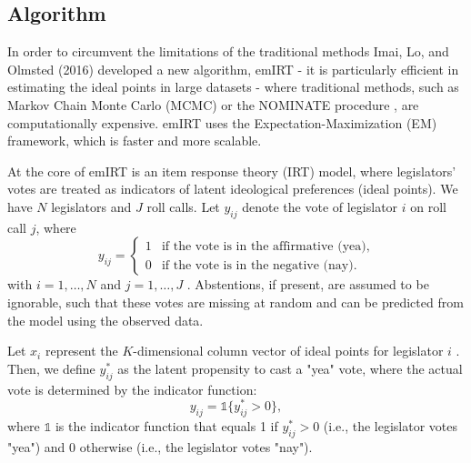 \documentclass[a4paper,12pt]{report}
\begin{document}
            \subsection{Algorithm}
                In order to circumvent the limitations of the traditional methods Imai, Lo, and Olmsted (2016) developed
                a
                new algorithm, emIRT - it is particularly efficient in estimating the ideal points in large datasets -
                where
                traditional methods, such as Markov Chain Monte Carlo
                (MCMC) or the NOMINATE procedure , are computationally expensive. emIRT uses the
                Expectation-Maximization (EM) framework, which is faster and more scalable.

                At the core of emIRT is an item response theory (IRT) model, where legislators' votes are treated as
                indicators of latent ideological preferences (ideal points).
                We have \( N \) legislators and \( J \) roll calls. Let \( y_{ij} \) denote the vote of legislator
                \( i \)
                on roll call \( j \), where
                \[
                    y_{ij} =
                    \begin{cases}
                        1 & \text{if the vote is in the affirmative (yea)}, \\
                        0 & \text{if the vote is in the negative (nay)}.
                    \end{cases}
                \]
                with \( i = 1, \dots, N \) and \( j = 1, \dots, J \)
                . Abstentions, if present, are assumed to be ignorable, such that these votes are missing at random and
                can be
                predicted from the model using the observed data.

                Let \( x_i \) represent the \( K \)-dimensional column vector of ideal points for legislator \( i \)
                . Then, we define \( y^*_{ij} \)
                as the latent propensity to cast a "yea" vote, where the actual vote is determined by the indicator
                function:
                \[
                    y_{ij} = \mathbb{1}\{ y^*_{ij} > 0 \},
                \]
                where \( \mathbb{1} \) is the indicator function that equals 1 if \( y^*_{ij} > 0 \)
                (i.e., the legislator votes "yea") and 0 otherwise (i.e., the legislator votes "nay").
\end{document}
